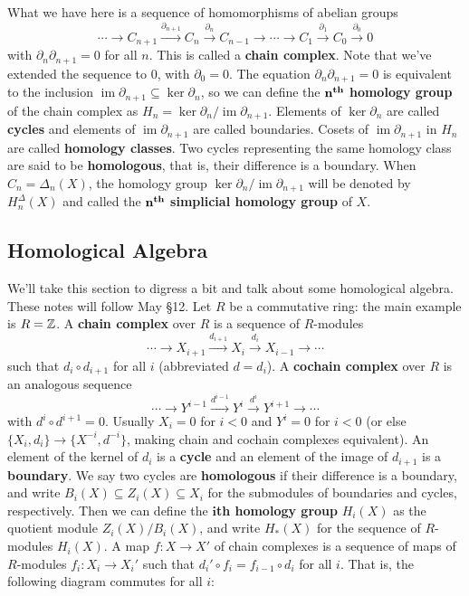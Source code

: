 What we have here is a sequence of homomorphisms of abelian groups \[
    \cdots \to C_{n+1}\overset{\partial _{n+1}}{\longrightarrow} C_n \overset{\partial _n }{\longrightarrow} C_{n-1}\to \cdots \to C_1\overset{\partial_1}{\longrightarrow}C_0\overset{\partial_0}{\longrightarrow}0 
\] with $\partial _n \partial _{n+1}=0$ for all $n$. This is called a \textbf{chain complex}. Note that  we've extended the sequence to $0$, with $\partial_0=0 $. The equation $\partial _n \partial _{n+1}=0$ is equivalent to the inclusion $\operatorname{im}\partial _{n+1}\subseteq \ker \partial _n $, so we can define the $\mathbf{n}^{\text{\textbf{th}}}$ \textbf{homology group} of the chain complex as $H_n =\ker \partial_n  / \operatorname{im} \partial _{n+1}$. Elements of $\ker \partial _n $ are called \textbf{cycles} and elements of $\operatorname{im}\partial _{n+1}$ are called boundaries. Cosets of $\operatorname{im}\partial _{n+1}$ in $H_n $ are called \textbf{homology classes}. Two cycles representing the same homology class are said to be \textbf{homologous}, that is, their difference is a boundary. When $C_n=\Delta _n (X)$, the homology group $\ker \partial _n / \operatorname{im}\partial _{n+1} $ will be denoted by $H_n ^{\Delta }(X)$ and called the $\mathbf{n}^{\text{\textbf{th}}}$ \textbf{simplicial homology group} of $X$.

\subsection{Homological Algebra}
We'll take this section to digress a bit and talk about some homological algebra. These notes will follow May \S 12.
\orbreak
Let $R$ be a commutative ring: the main example is $R=\mathbb{Z}$. A \textbf{chain complex} over $R$ is a sequence of $R$-modules \[
    \cdots \to X_{i+1}\overset{d_{i+1}}{\longrightarrow}X_i \overset{d_i }{\longrightarrow}X_{i-1}\to \cdots 
\] such that $d_i \circ d_{i+1}$ for all $i$ (abbreviated $d=d_i $). A \textbf{cochain complex} over $R$ is an analogous sequence \[
\cdots \to Y^{i-1}\overset{d^{i-1}}{\longrightarrow}Y^i \overset{d^i }{\longrightarrow}Y^{i+1}\to \cdots 
\] with $d^i \circ d^{i+1}=0$. Usually $X_i =0$ for $i<0$ and $Y^i =0$ for $i<0$ (or else $\{X_i ,d_i \} \to \{X^{-i},d^{-i}\} $, making chain and cochain complexes equivalent). An element of the kernel of $d_i $ is a \textbf{cycle} and an element of the image of $d_{i+1}$ is a \textbf{boundary}. We say two cycles are \textbf{homologous} if their difference is a boundary, and write $B_i (X) \subseteq Z_i  (X) \subseteq X_i $ for the submodules of boundaries and cycles, respectively. Then we can define the $\mathbf{i}$\textbf{th homology group} $H_i (X)$ as the quotient module $Z_i (X) /B_i (X)$, and write $H_*(X)$ for the sequence of $R $-modules $H_i (X)$.
\orbreak
A map $f \colon X \to X'$ of chain complexes is a sequence of maps of $R$-modules $f_i \colon X_i  \to X_i '$ such that $d_i '\circ f_i =f_{i-1}\circ d_i $ for all $i$. That is, the following diagram commutes for all $i$:
